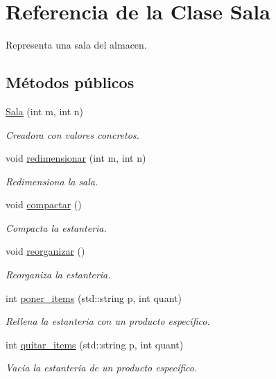 \hypertarget{class_sala}{}\section{Referencia de la Clase Sala}
\label{class_sala}


Representa una sala del almacen.  


\subsection*{Métodos públicos}
\begin{DoxyCompactItemize}
\item 
\mbox{\hyperlink{class_sala_a7b265bb95493f0c161e6403f7295a084}{Sala}} (int m, int n)
\begin{DoxyCompactList}\small\item\em Creadora con valores concretos. \end{DoxyCompactList}\item 
void \mbox{\hyperlink{class_sala_a610a42c817c28d95367063d09b0a5731}{redimensionar}} (int m, int n)
\begin{DoxyCompactList}\small\item\em Redimensiona la sala. \end{DoxyCompactList}\item 
void \mbox{\hyperlink{class_sala_aac11486a22560bdcdb7771e9692cfa75}{compactar}} ()
\begin{DoxyCompactList}\small\item\em Compacta la estanteria. \end{DoxyCompactList}\item 
void \mbox{\hyperlink{class_sala_aaac8d848595b493ea08516f2101b829e}{reorganizar}} ()
\begin{DoxyCompactList}\small\item\em Reorganiza la estanteria. \end{DoxyCompactList}\item 
int \mbox{\hyperlink{class_sala_aa65c68be5f5242570063fc5f0e8dafa2}{poner\+\_\+items}} (std\+::string p, int quant)
\begin{DoxyCompactList}\small\item\em Rellena la estanteria con un producto específico. \end{DoxyCompactList}\item 
int \mbox{\hyperlink{class_sala_afcdc6c283e5fca9632f279142ad613c3}{quitar\+\_\+items}} (std\+::string p, int quant)
\begin{DoxyCompactList}\small\item\em Vacia la estanteria de un producto específico. \end{DoxyCompactList}\item 

\end{DoxyCompactItemize}
